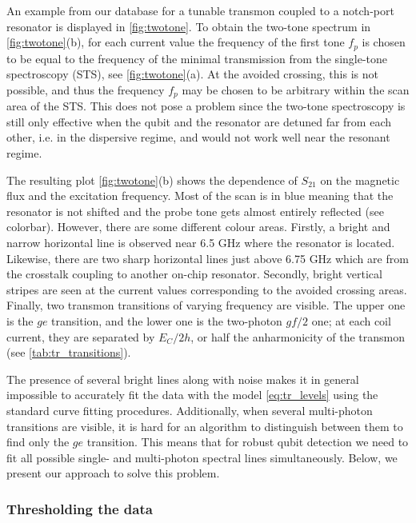 \documentclass[%
 aip,
 amsmath,amssymb,
 reprint,%
]{revtex4-1}
\begin{document}
An example from our database for a tunable transmon coupled to a notch-port resonator is displayed in \autoref{fig:twotone}. To obtain the two-tone spectrum in \autoref{fig:twotone}(b), for each current value the frequency of the first tone $f_p$ is chosen to be equal to the frequency of the minimal transmission from the single-tone spectroscopy (STS), see \autoref{fig:twotone}(a). At the avoided crossing, this is not possible, and thus the frequency $f_p$ may be chosen to be arbitrary within the scan area of the STS. This does not pose a problem since the two-tone spectroscopy is still only effective when the qubit and the resonator are detuned far from each other, i.e. in the dispersive regime\cite{blais2004}, and would not work well near the resonant regime.

The resulting plot \autoref{fig:twotone}(b) shows the dependence of $S_{21}$ on the magnetic flux and the excitation frequency. Most of the scan is in blue meaning that the resonator is not shifted and the probe tone gets almost entirely reflected (see colorbar). However, there are some different colour areas. Firstly, a bright and narrow horizontal line is observed near 6.5 GHz where the resonator is located. Likewise, there are two sharp horizontal lines just above 6.75 GHz which are from the crosstalk coupling to another on-chip resonator. Secondly, bright vertical stripes are seen at the current values corresponding to the avoided crossing areas. Finally, two transmon transitions of varying frequency are visible. The upper one is the $ge$ transition, and the lower one is the two-photon $gf/2$ one; at each coil current, they are separated by $E_C/2h$, or half the anharmonicity of the transmon (see \autoref{tab:tr_transitions}).

The presence of several bright lines along with noise makes it in general impossible to accurately fit the data with the model \eqref{eq:tr_levels} using the standard curve fitting procedures. Additionally, when several multi-photon transitions are visible, it is hard for an algorithm to distinguish between them to find only the $ge$ transition. This means that for robust qubit detection we need to fit all possible single- and multi-photon spectral lines simultaneously. Below, we present our approach to solve this problem.



\subsubsection{Thresholding the data}
\end{document}
